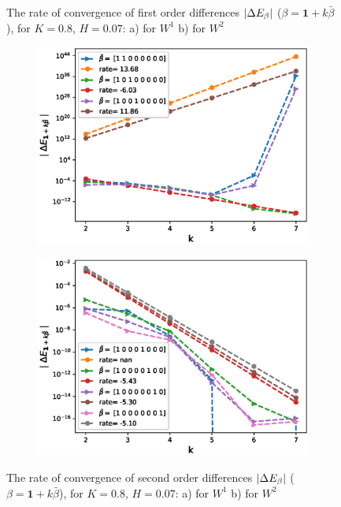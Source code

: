 \documentclass[11pt]{article}
\begin{document}
\begin{figure}[h!]
	
	
	\caption{The rate of convergence of  first order differences $\left\lvert\Delta E_{\beta}\right\rvert$ ($\beta=\mathbf{1}+k \bar{\beta}$), for $K=0.8$, $H=0.07$: a) for $W^1$ b) for $W^2$}
	\label{fig:first_diff_comp_K_08_H_007_wihtout_change_measure}
\end{figure}


\begin{figure}[h!]
	\centering
	\begin{subfigure}{.4\textwidth}
		\centering
		\includegraphics[width=1\linewidth]{./figures/rBergomi_mixed_error_rates/without_change_measure/N_4/H_007/mixed_difference_order2_rbergomi_4steps_H_007_K_08_totally_hierarch_with_rate_W1}
		\caption{}
		\label{fig:sub3}
	\end{subfigure}%
	\begin{subfigure}{.4\textwidth}
		\centering
		\includegraphics[width=1\linewidth]{./figures/rBergomi_mixed_error_rates/without_change_measure/N_4/H_007/mixed_difference_order2_rbergomi_4steps_H_007_K_08_totally_hierarch_with_rate_W2}
		\caption{}
		\label{fig:sub4}
	\end{subfigure}
	
	\caption{The rate of convergence of  second order differences $\left\lvert\Delta E_{\beta}\right\rvert$ ($\beta=\mathbf{1}+k \bar{\beta}$), for $K=0.8$, $H=0.07$: a) for $W^1$ b) for $W^2$}
	\label{fig:second_diff_comp_K_08_H_007_wihtout_change_measure}
\end{figure}
\end{document}
